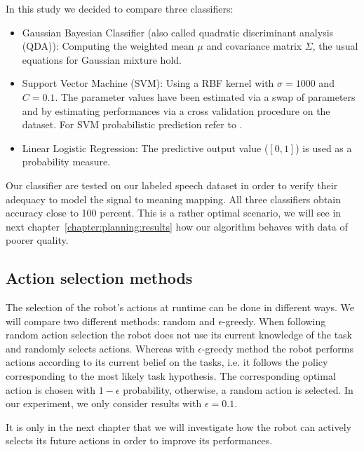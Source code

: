 In this study we decided to compare three classifiers:
\begin{itemize}
\item Gaussian Bayesian Classifier (also called quadratic discriminant analysis (QDA)): Computing the weighted mean $\mu$ and covariance matrix $\Sigma$, the usual equations for Gaussian mixture hold.
\item Support Vector Machine (SVM): Using a RBF kernel with $\sigma = 1000$ and $C = 0.1$. The parameter values have been estimated via a swap of parameters and by estimating performances via a cross validation procedure on the dataset. For SVM probabilistic prediction refer to \cite{platt1999probabilistic}.
\item Linear Logistic Regression: The predictive output value ($[0,1]$) is used as a probability measure.
\end{itemize}

Our classifier are tested on our labeled speech dataset in order to verify their adequacy to model the signal to meaning mapping. All three classifiers obtain accuracy close to 100 percent. This is a rather optimal scenario, we will see in next chapter~\ref{chapter:planning:results} how our algorithm behaves with data of poorer quality.

\subsection{Action selection methods}


The selection of the robot's actions at runtime can be done in different ways. We will compare two different methods: random and  $\epsilon$-greedy. When following random action selection the robot does not use its current knowledge of the task and randomly selects actions. Whereas with $\epsilon$-greedy method the robot performs actions according to its current belief on the tasks, i.e. it follows the policy corresponding to the most likely task hypothesis. The corresponding optimal action is chosen with $1-\epsilon$ probability, otherwise, a random action is selected. In our experiment, we only consider results with $\epsilon =  0.1$.

It is only in the next chapter that we will investigate how the robot can actively selects its future actions in order to improve its performances.

\transition

